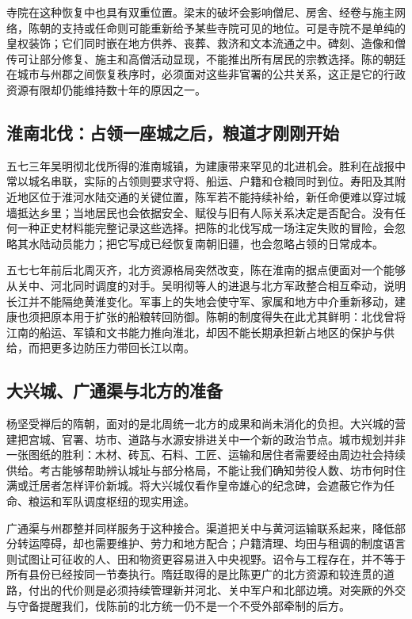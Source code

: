 寺院在这种恢复中也具有双重位置。梁末的破坏会影响僧尼、房舍、经卷与施主网络，陈朝的支持或任命则可能重新给予某些寺院可见的地位。可是寺院不是单纯的皇权装饰；它们同时嵌在地方供养、丧葬、救济和文本流通之中。碑刻、造像和僧传可让部分修复、施主和高僧活动显现，不能推出所有居民的宗教选择。陈的朝廷在城市与州郡之间恢复秩序时，必须面对这些非官署的公共关系，这正是它的行政资源有限却仍能维持数十年的原因之一。

\subsection{淮南北伐：占领一座城之后，粮道才刚刚开始}

五七三年吴明彻北伐所得的淮南城镇，为建康带来罕见的北进机会。胜利在战报中常以城名串联，实际的占领则要求守将、船运、户籍和仓粮同时到位。寿阳及其附近地区位于淮河水陆交通的关键位置，陈军若不能持续补给，新任命便难以穿过城墙抵达乡里；当地居民也会依据安全、赋役与旧有人际关系决定是否配合。没有任何一种正史材料能完整记录这些选择。把陈的北伐写成一场注定失败的冒险，会忽略其水陆动员能力；把它写成已经恢复南朝旧疆，也会忽略占领的日常成本。

五七七年前后北周灭齐，北方资源格局突然改变，陈在淮南的据点便面对一个能够从关中、河北同时调度的对手。吴明彻等人的进退与北方军政整合相互牵动，说明长江并不能隔绝黄淮变化。军事上的失地会使守军、家属和地方中介重新移动，建康也须把原本用于扩张的船粮转回防御。陈朝的制度得失在此尤其鲜明：北伐曾将江南的船运、军镇和文书能力推向淮北，却因不能长期承担新占地区的保护与供给，而把更多边防压力带回长江以南。

\subsection{大兴城、广通渠与北方的准备}

杨坚受禅后的隋朝，面对的是北周统一北方的成果和尚未消化的负担。大兴城的营建把宫城、官署、坊市、道路与水源安排进关中一个新的政治节点。城市规划并非一张图纸的胜利：木材、砖瓦、石料、工匠、运输和居住者需要经由周边社会持续供给。考古能够帮助辨认城址与部分格局，不能让我们确知劳役人数、坊市何时住满或迁居者怎样评价新城。将大兴城仅看作皇帝雄心的纪念碑，会遮蔽它作为任命、粮运和军队调度枢纽的现实用途。

广通渠与州郡整并同样服务于这种接合。渠道把关中与黄河运输联系起来，降低部分转运障碍，却也需要维护、劳力和地方配合；户籍清理、均田与租调的制度语言则试图让可征收的人、田和物资更容易进入中央视野。诏令与工程存在，并不等于所有县份已经按同一节奏执行。隋廷取得的是比陈更广的北方资源和较连贯的道路，付出的代价则是必须持续管理新并河北、关中军户和北部边境。对突厥的外交与守备提醒我们，伐陈前的北方统一仍不是一个不受外部牵制的后方。

